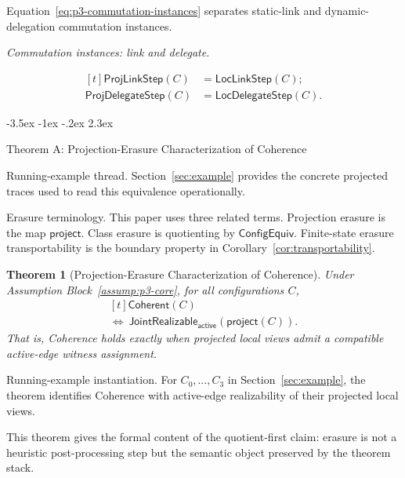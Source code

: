 \documentclass[a4paper,10pt,twocolumn,english]{article}
\makeatletter
\renewcommand{\section}{\@startsection{section}{1}{\z@}%
  {-3.5ex \@plus -1ex \@minus -.2ex}%
  {2.3ex}%
  {\raggedright\normalfont\large\bfseries}}
\numberwithin{equation}{section}
\theoremstyle{paperdef}
\theoremstyle{paperplain}
\newtheorem{theorem}[definition]{Theorem}
\theoremstyle{paperdef}
\theoremstyle{paperremark}
\theoremstyle{paperdef}
\newcommand{\Coherent}{\ensuremath{\mathsf{Coherent}}}
\newcommand{\ConfigEquiv}{\ensuremath{\mathsf{ConfigEquiv}}}
\newcommand{\ProjLink}[1]{\ensuremath{\mathsf{ProjLinkStep}(#1)}}
\newcommand{\LocLink}[1]{\ensuremath{\mathsf{LocLinkStep}(#1)}}
\newcommand{\ProjDelegate}[1]{\ensuremath{\mathsf{ProjDelegateStep}(#1)}}
\newcommand{\LocDelegate}[1]{\ensuremath{\mathsf{LocDelegateStep}(#1)}}
\newcommand{\JointActive}[1]{\ensuremath{\mathsf{JointRealizable}_{\mathsf{active}}(#1)}}
\newcommand{\eqnote}[1]{\par\noindent\textit{#1.}\par\vspace{2pt}}
\makeatother
\begin{document}
Equation~\ref{eq:p3-commutation-instances} separates static-link and dynamic-delegation commutation instances.
\eqnote{Commutation instances: link and delegate}
\begin{equation}
	\label{eq:p3-commutation-instances}
	\begin{aligned}[t]
		\ProjLink{C}     & = \LocLink{C};     \\
		\ProjDelegate{C} & = \LocDelegate{C}.
	\end{aligned}
\end{equation}

\section{Theorem A: Projection-Erasure Characterization of Coherence}
\label{sec:theorem-a}

Running-example thread. Section~\ref{sec:example} provides the concrete
projected traces used to read this equivalence operationally.

Erasure terminology. This paper uses three related terms. Projection erasure is
the map $\mathsf{project}$. Class erasure is quotienting by \ConfigEquiv.
Finite-state erasure transportability is the boundary property in
Corollary~\ref{cor:transportability}.

\begin{theorem}[Projection-Erasure Characterization of Coherence]
	\label{thm:erasure}
	Under Assumption Block~\ref{assump:p3-core}, for all configurations $C$,
	\begin{equation}
		\begin{aligned}[t]
			\Coherent(C)
			\\
			\iff\ \JointActive{\mathsf{project}(C)}.
		\end{aligned}
	\end{equation}
	That is, Coherence holds exactly when projected local views admit a compatible active-edge witness assignment.
\end{theorem}

Running-example instantiation. For $C_0,\dots,C_3$ in
Section~\ref{sec:example}, the theorem identifies Coherence with active-edge
realizability of their projected local views.

This theorem gives the formal content of the quotient-first claim: erasure is not a heuristic post-processing step but the semantic object preserved by the theorem stack.
\end{document}
